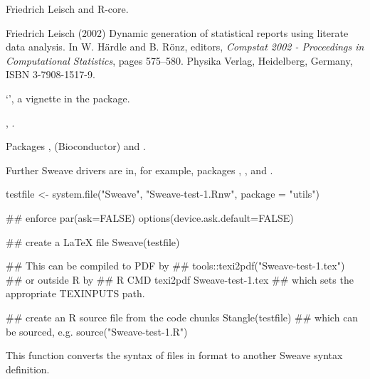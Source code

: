 %
\begin{Author}\relax
Friedrich Leisch and R-core.
\end{Author}
%
\begin{References}\relax
Friedrich Leisch (2002)
Dynamic generation of statistical reports using literate data analysis.
In W. Härdle and B. Rönz, editors,
\emph{Compstat 2002 - Proceedings in Computational Statistics},
pages 575--580. Physika Verlag, Heidelberg, Germany, ISBN 3-7908-1517-9.
\end{References}
%
\begin{SeeAlso}\relax
`', a vignette in
the  package.

, .

Packages ,  (Bioconductor) and
.

Further Sweave drivers are in, for example, packages ,
,  and .
\end{SeeAlso}
%
\begin{Examples}
\begin{ExampleCode}
testfile <- system.file("Sweave", "Sweave-test-1.Rnw", package = "utils")

## enforce par(ask=FALSE)
options(device.ask.default=FALSE)

## create a LaTeX file
Sweave(testfile)

## This can be compiled to PDF by
## tools::texi2pdf("Sweave-test-1.tex")
## or outside R by
## R CMD texi2pdf Sweave-test-1.tex
## which sets the appropriate TEXINPUTS path.

## create an R source file from the code chunks
Stangle(testfile)
## which can be sourced, e.g.
source("Sweave-test-1.R")


\end{ExampleCode}
\end{Examples}
%
\begin{Description}\relax
This function converts the syntax of files in 
format to another Sweave syntax definition. 
\end{Description}
